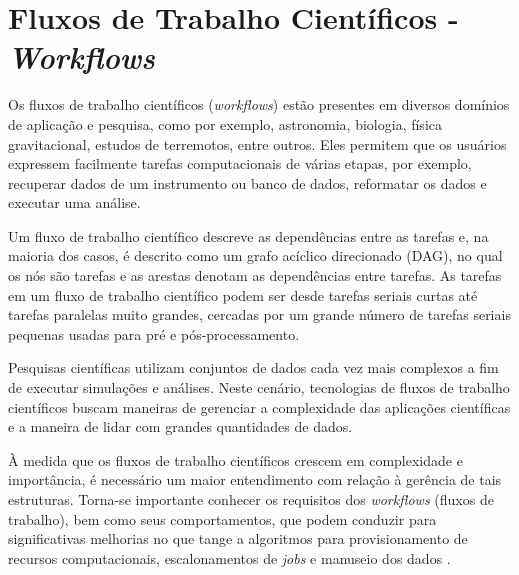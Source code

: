 \documentclass[tese,capa]{texufpel}
\begin{document}
\section{Fluxos de Trabalho Científicos - \emph{Workflows}}

Os fluxos de trabalho científicos (\emph{workflows}) estão presentes em diversos domínios de aplicação e pesquisa, como por exemplo, astronomia, biologia, física gravitacional, estudos de terremotos, entre outros. Eles permitem que os usuários expressem facilmente tarefas computacionais de várias etapas, por exemplo, recuperar dados de um instrumento ou banco de dados, reformatar os dados e executar uma análise. 

Um fluxo de trabalho científico descreve as dependências entre as tarefas e, na maioria dos casos, é descrito como um grafo acíclico direcionado (DAG), no qual os nós são tarefas e as arestas denotam as dependências entre tarefas. As tarefas em um fluxo de trabalho científico podem ser desde tarefas seriais curtas até tarefas paralelas muito grandes, cercadas por um grande número de tarefas seriais pequenas usadas para pré e pós-processamento.

Pesquisas científicas utilizam conjuntos de dados cada vez mais complexos a fim de executar simulações e análises. Neste cenário, tecnologias de fluxos de trabalho científicos buscam maneiras de gerenciar a complexidade das aplicações científicas e a maneira de lidar com grandes quantidades de dados.

À medida que os fluxos de trabalho científicos crescem em complexidade e importância, é necessário um maior entendimento com relação à gerência de tais estruturas. Torna-se importante conhecer os requisitos dos \emph{workflows} (fluxos de trabalho), bem como seus comportamentos, que podem conduzir para significativas melhorias no que tange a algoritmos para provisionamento de recursos computacionais, escalonamentos de \emph{jobs} e manuseio dos dados \cite{juveCharacterizingProfilingScientific2013}.

\end{document}
